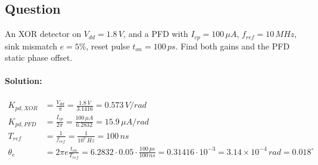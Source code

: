 \subsection{Question}
An XOR detector on \(V_{dd} = 1.8\,V\), and a PFD with \(I_{cp} = 100\,\mu A\),
\(f_{ref} = 10\,MHz\), sink mismatch \(e = 5\%\), reset pulse \(t_{on} = 100\,ps\).
Find both gains and the PFD static phase offset.
\paragraph{Solution:}
\begin{align*}
  K_{pd,XOR} &= \frac{V_{dd}}{\pi} = \frac{1.8\,V}{3.1416} = 0.573\,V/rad \\
  K_{pd,PFD} &= \frac{I_{cp}}{2\pi} = \frac{100\,\mu A}{6.2832} = 15.9\,\mu A/rad \\
  T_{ref} &= \frac{1}{f_{ref}} = \frac{1}{10^7\,Hz} = 100\,ns \\
  \theta_e &= 2\pi e \frac{t_{on}}{T_{ref}} = 6.2832 \cdot 0.05 \cdot \frac{100\,ps}{100\,ns} = 0.31416 \cdot 10^{-3} = 3.14 \times 10^{-4}\,rad = 0.018^\circ
\end{align*}

